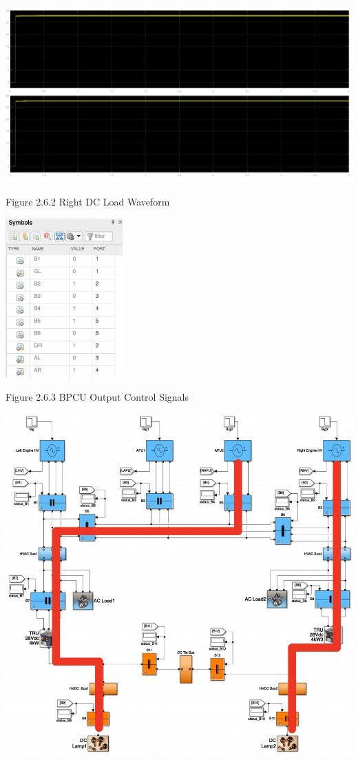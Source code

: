 \documentclass{mcmthesis}
\begin{document}
\includegraphics[trim= 0 0.255\imageheight{} 0 0, clip, width = 0.185\imageheight{}]{gl_al_load2.png}
\begin{center}
\small{Figure 2.6.2 Right DC Load Waveform}
\end{center}
\begin{center}
\includegraphics[width=4.5cm]{gl_al_signals.png}
\end{center}
\begin{center}
\small{Figure 2.6.3 BPCU Output Control Signals}
\end{center}
\begin{center}
\includegraphics[width=14.5cm]{gl_al.png}
\end{center}
\end{document}

